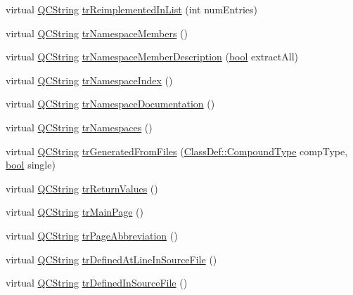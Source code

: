 \begin{DoxyCompactItemize}
virtual \hyperlink{class_q_c_string}{Q\+C\+String} \hyperlink{class_translator_czech_abc2d7cab9e98ac06d13ba4befb4afbd6}{tr\+Reimplemented\+In\+List} (int num\+Entries)
\item 
virtual \hyperlink{class_q_c_string}{Q\+C\+String} \hyperlink{class_translator_czech_a4457071701f72bcb850102e53cd64c75}{tr\+Namespace\+Members} ()
\item 
virtual \hyperlink{class_q_c_string}{Q\+C\+String} \hyperlink{class_translator_czech_a498d1a63aef8b403bbeac2563da82d11}{tr\+Namespace\+Member\+Description} (\hyperlink{qglobal_8h_a1062901a7428fdd9c7f180f5e01ea056}{bool} extract\+All)
\item 
virtual \hyperlink{class_q_c_string}{Q\+C\+String} \hyperlink{class_translator_czech_a815ce8b674d619b8943bbb8401b650cc}{tr\+Namespace\+Index} ()
\item 
virtual \hyperlink{class_q_c_string}{Q\+C\+String} \hyperlink{class_translator_czech_aed98b4b0372e2a01891c1da49b012800}{tr\+Namespace\+Documentation} ()
\item 
virtual \hyperlink{class_q_c_string}{Q\+C\+String} \hyperlink{class_translator_czech_ad9479ea66626a1742febf18f2be4776c}{tr\+Namespaces} ()
\item 
virtual \hyperlink{class_q_c_string}{Q\+C\+String} \hyperlink{class_translator_czech_a436f948112829e211ffc6df0887ef06e}{tr\+Generated\+From\+Files} (\hyperlink{class_class_def_ae70cf86d35fe954a94c566fbcfc87939}{Class\+Def\+::\+Compound\+Type} comp\+Type, \hyperlink{qglobal_8h_a1062901a7428fdd9c7f180f5e01ea056}{bool} single)
\item 
virtual \hyperlink{class_q_c_string}{Q\+C\+String} \hyperlink{class_translator_czech_a3a23afb35840149ceb0fcb35ee497cc3}{tr\+Return\+Values} ()
\item 
virtual \hyperlink{class_q_c_string}{Q\+C\+String} \hyperlink{class_translator_czech_aefbb45a259a2466aeaece52e794df102}{tr\+Main\+Page} ()
\item 
virtual \hyperlink{class_q_c_string}{Q\+C\+String} \hyperlink{class_translator_czech_a49aa917d4f38759122d8bd33ca40f830}{tr\+Page\+Abbreviation} ()
\item 
virtual \hyperlink{class_q_c_string}{Q\+C\+String} \hyperlink{class_translator_czech_aa19995a2d5e1e5da77023ab8f639fa35}{tr\+Defined\+At\+Line\+In\+Source\+File} ()
\item 
virtual \hyperlink{class_q_c_string}{Q\+C\+String} \hyperlink{class_translator_czech_a66eab5854a5e8216638141595714c5ae}{tr\+Defined\+In\+Source\+File} ()
\item 

\end{DoxyCompactItemize}

